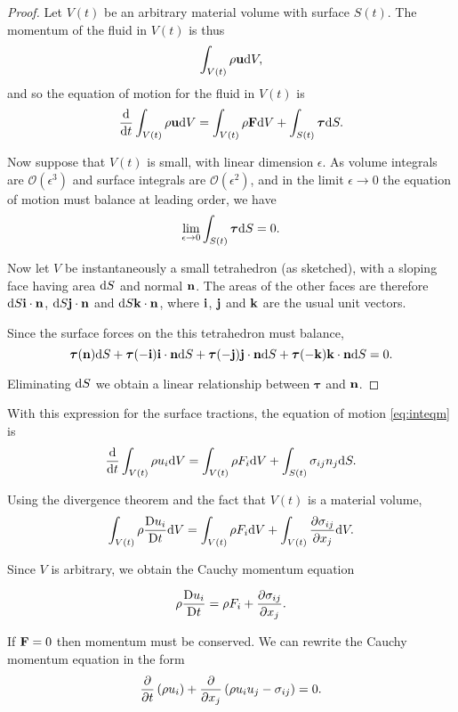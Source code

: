 \documentclass{notes}
\newcommand{\cO}{\mathcal{O}}
\newcommand{\bt}{\boldsymbol{\tau}}
\theoremstyle{plain}
\begin{document}
\begin{proof}
Let $V(t)$ be an arbitrary material volume with surface $S(t)$.  The
momentum of the fluid in $V(t)$ is thus
\[
\int_{V(t)} \rho \mathbf{u} \mathrm{d} V,
\]
and so the equation of motion for the fluid in $V(t)$ is
\begin{equation}\label{eq:inteqm}
\diff{}{t} \int_{V(t)} \rho \vu \ud V = \int_{V(t)} \rho \vF \ud V
+ \int_{S(t)} \bt \ud S.
\end{equation}

Now suppose that $V(t)$ is small, with linear dimension $\epsilon$.
As volume integrals are $\cO(\epsilon^3)$ and surface integrals
are $\cO(\epsilon^2)$, and in the limit $\epsilon \to 0$ the
equation of motion must balance at leading order, we have
\[
\lim_{\epsilon \to 0} \int_{S(t)} \bt \ud S = 0.
\]

\vspace{1in}

Now let $V$ be instantaneously a small tetrahedron (as sketched),
with a sloping face having area $\mathrm{d} S$ and normal $\mathbf{n}$.  The areas
of the other faces are therefore
$\mathrm{d} S \mathbf{i}\cdot \mathbf{n}$, $\mathrm{d} S \mathbf{j} \cdot \mathbf{n}$ and $\mathrm{d} S
\mathbf{k} \cdot \mathbf{n}$, where $\mathbf{i}$, $\mathbf{j}$ and $\mathbf{k}$ are the
usual unit vectors.

Since the surface forces on the this tetrahedron must balance,
\[
\bt(\vn) \ud S + \bt(-\vect{i}) \vect{i}\cdot \vn \ud S
+ \bt(-\vect{j}) \vect{j}\cdot \vn \ud S
+ \bt(-\vect{k}) \vect{k}\cdot \vn \ud S = 0.
\]

Eliminating $\mathrm{d} S$ we obtain a linear relationship between $\bt$
and $\mathbf{n}$.
\end{proof}

With this expression for the surface tractions, the equation of motion
\eqref{eq:inteqm} is
\[
\frac{\mathrm{d}}{\mathrm{d} t} \int_{V(t)} \rho u_i \mathrm{d} V
= \int_{V(t)} \rho F_i \mathrm{d} V + \int_{S(t)} \sigma_{i j} n_j \mathrm{d} S.
\]

Using the divergence theorem and the fact that $V(t)$ is a material volume,
\[
\int_{V(t)} \rho \frac{\mathrm{D} u_i}{\mathrm{D} t} \mathrm{d} V = \int_{V(t)} \rho F_i \mathrm{d} V
+ \int_{V(t)} \frac{\partial \sigma_{i j}}{\partial x_j} \mathrm{d} V.
\]

Since $V$ is arbitrary, we obtain the Cauchy momentum equation

\begin{equation}\label{eq:cauchy}
\rho \frac{\mathrm{D} u_i}{\mathrm{D} t} = \rho F_i + \frac{\partial \sigma_{i j}}{\partial x_j}.
\end{equation}

If $\mathbf{F} = 0$ then momentum must be conserved.  We can rewrite
the Cauchy momentum equation in the form
\[
\frac{\partial }{\partial t} \left( \rho u_i \right)
+ \frac{\partial }{\partial x_j} \left( \rho u_i u_j - \sigma_{i j}\right) = 0.
\]
\end{document}
